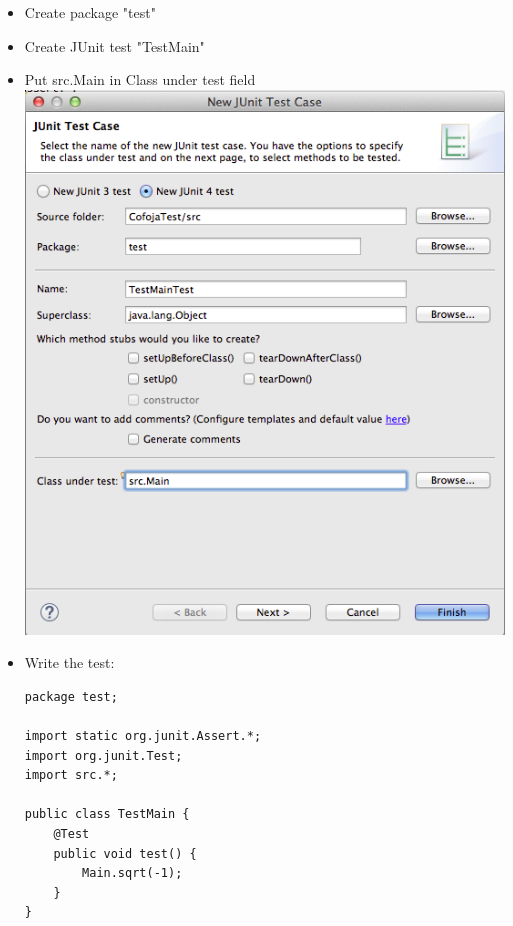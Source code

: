\documentclass{article}
\begin{document}
\begin{itemize}
\item Create package "test"
\item Create JUnit test "TestMain"
\item Put src.Main in Class under test field\\
\includegraphics[scale=0.4]{Photos/8.png}\\
\item Write the test:
\begin{lstlisting}
package test;

import static org.junit.Assert.*;
import org.junit.Test;
import src.*;

public class TestMain {
	@Test
	public void test() {
		Main.sqrt(-1);
	}
}


\end{lstlisting}
\end{itemize}
\end{document}
